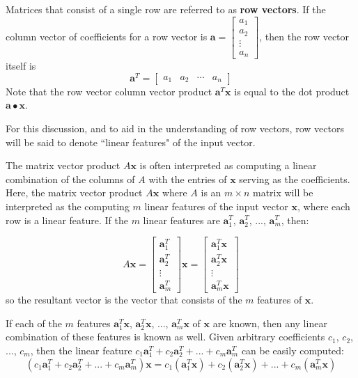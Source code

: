 \documentclass{article}
\begin{document}
Matrices that consist of a single row are referred to as {\bf row vectors}. If the column vector of coefficients for a row vector is \(\mathbf{a} = \begin{bmatrix}
a_1 \\ a_2 \\ \vdots \\ a_n 
\end{bmatrix}\), then the row vector itself is \[\mathbf{a}^T = \begin{bmatrix}
a_1 & a_2 & \cdots & a_n 
\end{bmatrix}\]
Note that the row vector column vector product \(\mathbf{a}^T\mathbf{x}\) is equal to the dot product \(\mathbf{a} \bullet \mathbf{x}\).

For this discussion, and to aid in the understanding of row vectors, row vectors will be said to denote ``linear features" of the input vector.

The matrix vector product \(A\mathbf{x}\) is often interpreted as computing a linear combination of the columns of \(A\) with the entries of \(\mathbf{x}\) serving as the coefficients. Here, the matrix vector product \(A\mathbf{x}\) where \(A\) is an \(m \times n\) matrix will be interpreted as the computing \(m\) linear features of the input vector \(\mathbf{x}\), where each row is a linear feature. If the \(m\) linear features are \(\mathbf{a}_1^T\), \(\mathbf{a}_2^T\), ..., \(\mathbf{a}_m^T\), then:

\[A\mathbf{x} = \begin{bmatrix}
\mathbf{a}_1^T \\ \mathbf{a}_2^T \\ \vdots \\ \mathbf{a}_m^T
\end{bmatrix}\mathbf{x} = \begin{bmatrix}
\mathbf{a}_1^T\mathbf{x} \\ \mathbf{a}_2^T\mathbf{x} \\ \vdots \\ \mathbf{a}_m^T\mathbf{x} \end{bmatrix}\] 
so the resultant vector is the vector that consists of the \(m\) features of \(\mathbf{x}\).

\vspace{5mm}

If each of the \(m\) features \(\mathbf{a}_1^T\mathbf{x}\), \(\mathbf{a}_2^T\mathbf{x}\), ..., \(\mathbf{a}_m^T\mathbf{x}\) of \(\mathbf{x}\) are known, then any linear combination of these features is known as well. Given arbitrary coefficients \(c_1\), \(c_2\), ..., \(c_m\), then the linear feature \(c_1 \mathbf{a}_1^T + c_2 \mathbf{a}_2^T + ... + c_m \mathbf{a}_m^T\) can be easily computed:
\[(c_1 \mathbf{a}_1^T + c_2 \mathbf{a}_2^T + ... + c_m \mathbf{a}_m^T)\mathbf{x} = c_1 (\mathbf{a}_1^T \mathbf{x}) + c_2 (\mathbf{a}_2^T \mathbf{x}) + ... + c_m (\mathbf{a}_m^T \mathbf{x})\]
\end{document}
